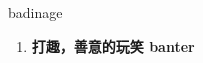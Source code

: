 
\begin{frame}
{\huge badinage}
\begin{center}
\begin{enumerate}\Large
  \item \textbf{打趣，善意的玩笑 banter}
\end{enumerate}
\end{center}
\end{frame}
